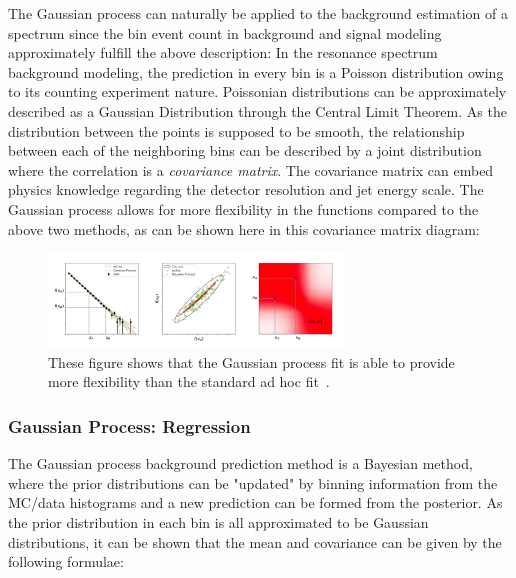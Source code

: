     The Gaussian process can naturally be applied to the background estimation of a spectrum since the bin event count in background and signal modeling approximately fulfill the above description: In the resonance spectrum background modeling, the prediction in every bin is a Poisson distribution owing to its counting experiment nature. Poissonian distributions can be approximately described as a Gaussian Distribution through the Central Limit Theorem. As the distribution between the points is supposed to be smooth, the relationship between each of the neighboring bins can be described by a joint distribution where the correlation is a \textit{covariance matrix}. The covariance matrix can embed physics knowledge regarding the detector resolution and jet energy scale. The Gaussian process allows for more flexibility in the functions compared to the above two methods, as can be shown here in this covariance matrix diagram:

    \begin{figure}[!htb]
        \begin{center}
            \includegraphics[width=0.7\textwidth]{figures/chapter_analysismethod/GP}
            \caption{
                These figure shows that the Gaussian process fit is able to provide more flexibility than the standard ad hoc fit~\cite{frate2017modeling}.
            }
            \label{fig:GaussianProcess}
        \end{center}
    \end{figure}
    \FloatBarrier


\subsubsection{Gaussian Process: Regression}

    The Gaussian process background prediction method is a Bayesian method, where the prior distributions can be "updated" by binning information from the MC/data histograms and a new prediction can be formed from the posterior. As the prior distribution in each bin is all approximated to be Gaussian distributions, it can be shown that the mean and covariance can be given by the following formulae:

